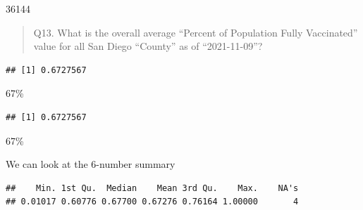 \documentclass[
]{article}
\newenvironment{Shaded}{\begin{snugshade}}{\end{snugshade}}
\newcommand{\AttributeTok}[1]{\textcolor[rgb]{0.77,0.63,0.00}{#1}}
\newcommand{\ConstantTok}[1]{\textcolor[rgb]{0.00,0.00,0.00}{#1}}
\newcommand{\FunctionTok}[1]{\textcolor[rgb]{0.00,0.00,0.00}{#1}}
\newcommand{\NormalTok}[1]{#1}
\newcommand{\OtherTok}[1]{\textcolor[rgb]{0.56,0.35,0.01}{#1}}
\newcommand{\SpecialCharTok}[1]{\textcolor[rgb]{0.00,0.00,0.00}{#1}}
\newcommand{\StringTok}[1]{\textcolor[rgb]{0.31,0.60,0.02}{#1}}
\begin{document}
36144

\begin{quote}
Q13. What is the overall average ``Percent of Population Fully
Vaccinated'' value for all San Diego ``County'' as of ``2021-11-09''?
\end{quote}

\begin{Shaded}
\end{Shaded}

\begin{verbatim}
## [1] 0.6727567
\end{verbatim}

67\%

\begin{Shaded}
\end{Shaded}

\begin{verbatim}
## [1] 0.6727567
\end{verbatim}

67\%

We can look at the 6-number summary

\begin{Shaded}
\end{Shaded}

\begin{verbatim}
##    Min. 1st Qu.  Median    Mean 3rd Qu.    Max.    NA's 
## 0.01017 0.60776 0.67700 0.67276 0.76164 1.00000       4
\end{verbatim}
\end{document}
